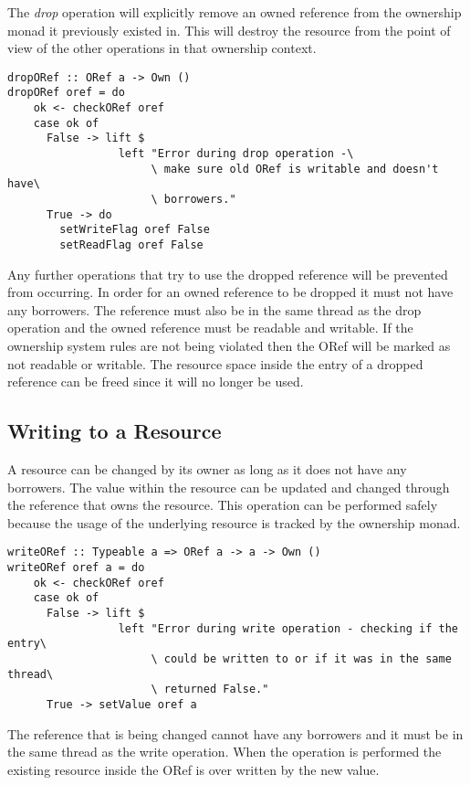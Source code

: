 \documentclass[onehalf,11pt]{beavtex}
\begin{document}
The \textit{drop} operation will explicitly remove an owned reference from the
ownership monad it previously existed in.
This will destroy the resource from the point of view of the other operations
in that ownership context.

\begin{verbatim}
dropORef :: ORef a -> Own ()
dropORef oref = do
    ok <- checkORef oref
    case ok of
      False -> lift $ 
                 left "Error during drop operation -\
                      \ make sure old ORef is writable and doesn't have\
                      \ borrowers."
      True -> do
        setWriteFlag oref False
        setReadFlag oref False
\end{verbatim}

Any further operations that try to use the dropped reference will be prevented
from occurring.
In order for an owned reference to be dropped it must not have any borrowers.
The reference must also be in the same thread as the drop operation and
the owned reference must be readable and writable.  If the ownership system rules
are not being violated then the ORef will be marked as not readable or writable.
The resource space inside the entry of a dropped reference can be freed since
it will no longer be used.

\subsection{Writing to a Resource}

A resource can be changed by its owner as long as it does not have any borrowers.
The value within the resource can be updated and changed through the reference
that owns the resource. This operation can be performed safely because the usage
of the underlying resource is tracked by the ownership monad.

\begin{verbatim}
writeORef :: Typeable a => ORef a -> a -> Own ()
writeORef oref a = do
    ok <- checkORef oref
    case ok of
      False -> lift $ 
                 left "Error during write operation - checking if the entry\
                      \ could be written to or if it was in the same thread\
                      \ returned False."
      True -> setValue oref a
\end{verbatim}

The reference that is being changed cannot have any borrowers and it must
be in the same thread as the write operation.
When the operation is performed the existing resource inside the ORef is over
written by the new value.
\end{document}

